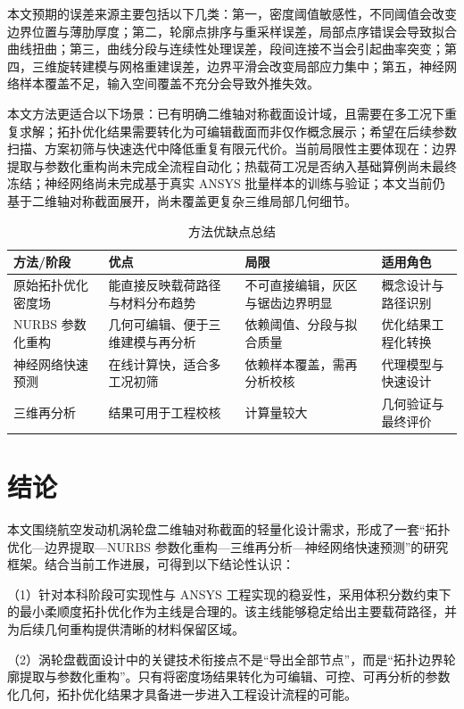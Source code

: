 \documentclass{FRB-style}
\begin{document}
本文预期的误差来源主要包括以下几类：第一，密度阈值敏感性，不同阈值会改变边界位置与薄肋厚度；第二，轮廓点排序与重采样误差，局部点序错误会导致拟合曲线扭曲；第三，曲线分段与连续性处理误差，段间连接不当会引起曲率突变；第四，三维旋转建模与网格重建误差，边界平滑会改变局部应力集中；第五，神经网络样本覆盖不足，输入空间覆盖不充分会导致外推失效。

本文方法更适合以下场景：已有明确二维轴对称截面设计域，且需要在多工况下重复求解；拓扑优化结果需要转化为可编辑截面而非仅作概念展示；希望在后续参数扫描、方案初筛与快速迭代中降低重复有限元代价。当前局限性主要体现在：边界提取与参数化重构尚未完成全流程自动化；热载荷工况是否纳入基础算例尚未最终冻结；神经网络尚未完成基于真实 ANSYS 批量样本的训练与验证；本文当前仍基于二维轴对称截面展开，尚未覆盖更复杂三维局部几何细节。

\begin{table}[H]
\centering
\caption{方法优缺点总结}
\begin{tabular}{p{}p{}p{}p{}}
\toprule
方法/阶段 & 优点 & 局限 & 适用角色 \\
\midrule
原始拓扑优化密度场 & 能直接反映载荷路径与材料分布趋势 & 不可直接编辑，灰区与锯齿边界明显 & 概念设计与路径识别 \\
NURBS 参数化重构 & 几何可编辑、便于三维建模与再分析 & 依赖阈值、分段与拟合质量 & 优化结果工程化转换 \\
神经网络快速预测 & 在线计算快，适合多工况初筛 & 依赖样本覆盖，需再分析校核 & 代理模型与快速设计 \\
三维再分析 & 结果可用于工程校核 & 计算量较大 & 几何验证与最终评价 \\
\bottomrule
\end{tabular}
\end{table}

\section*{结论}
{}

本文围绕航空发动机涡轮盘二维轴对称截面的轻量化设计需求，形成了一套“拓扑优化—边界提取—NURBS 参数化重构—三维再分析—神经网络快速预测”的研究框架。结合当前工作进展，可得到以下结论性认识：

（1）针对本科阶段可实现性与 ANSYS 工程实现的稳妥性，采用体积分数约束下的最小柔顺度拓扑优化作为主线是合理的。该主线能够稳定给出主要载荷路径，并为后续几何重构提供清晰的材料保留区域。

（2）涡轮盘截面设计中的关键技术衔接点不是“导出全部节点”，而是“拓扑边界轮廓提取与参数化重构”。只有将密度场结果转化为可编辑、可控、可再分析的参数化几何，拓扑优化结果才具备进一步进入工程设计流程的可能。
\end{document}
